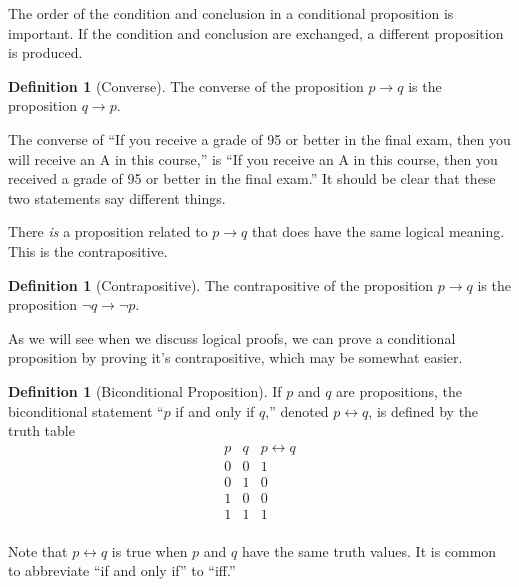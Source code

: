 \documentclass[10pt,]{book}
\theoremstyle{plain}
\theoremstyle{definition}
\newtheorem{definition}[theorem]{Definition}
\theoremstyle{definition}
\theoremstyle{definition}
\theoremstyle{definition}
\begin{document}
\par
The order of the condition and conclusion in a conditional proposition is important. If the condition and conclusion are exchanged, a different proposition is produced.%
\begin{definition}[Converse]\label{def-converse}
 The converse of the proposition \(p \rightarrow q\) is the proposition \(q \rightarrow p\).%
\end{definition}
\par
The converse of ``If you receive a grade of 95 or better in the final exam, then you will receive an A in this course,'' is ``If you receive an A in this course, then you received a grade of 95 or better in the final exam.'' It should be clear that these two statements say different things.%
\par
There \emph{is} a proposition related to \(p \rightarrow q\) that does have the same logical meaning.  This is the contrapositive.%
\begin{definition}[Contrapositive]\label{def-contrapositive}
 The contrapositive of the proposition \(p \rightarrow q\) is the proposition \(\neg q \rightarrow \neg p\).%
\end{definition}
\par
As we will see when we discuss logical proofs, we can prove a conditional proposition by proving it's contrapositive, which may be somewhat easier.%
\begin{definition}[Biconditional Proposition]\label{def-biconditional}
\label{notation-5}
If \(p\) and \(q\) are propositions, the biconditional statement ``\(p\)
if and only if \(q\),'' denoted \(p \leftrightarrow q\), is defined by the truth table
\begin{equation*}
\begin{array}{ccc}
 p & q & p\leftrightarrow q \\
 \hline
 0 & 0 & 1 \\
 0 & 1 & 0 \\
 1 & 0 & 0 \\
 1 & 1 & 1 \\
\end{array}
\end{equation*}
%
\end{definition}
\par
Note that \(p \leftrightarrow q\) is true when \(p\) and \(q\) have the same truth values. It is common to abbreviate ``if and only if'' to ``iff.''%
\par
\end{document}
